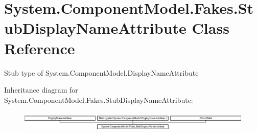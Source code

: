 \hypertarget{class_system_1_1_component_model_1_1_fakes_1_1_stub_display_name_attribute}{\section{System.\-Component\-Model.\-Fakes.\-Stub\-Display\-Name\-Attribute Class Reference}
\label{class_system_1_1_component_model_1_1_fakes_1_1_stub_display_name_attribute}
}


Stub type of System.\-Component\-Model.\-Display\-Name\-Attribute 


Inheritance diagram for System.\-Component\-Model.\-Fakes.\-Stub\-Display\-Name\-Attribute\-:\begin{figure}[H]
\begin{center}
\leavevmode
\includegraphics[height=0.990274cm]{class_system_1_1_component_model_1_1_fakes_1_1_stub_display_name_attribute}
\end{center}
\end{figure}

